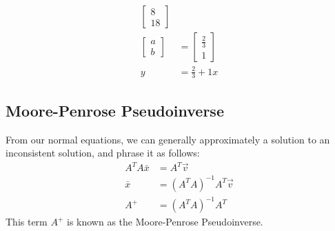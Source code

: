 \documentclass{math}
\begin{document}
\begin{align*}
\begin{bmatrix}
    8 \\ 18
  \end{bmatrix} \\
  \begin{bmatrix}
    a \\ b
  \end{bmatrix} &= \begin{bmatrix}
    \frac{2}{3} \\ 1
  \end{bmatrix} \\
  y &= \frac{2}{3}+1x
\end{align*}

\subsection*{Moore-Penrose Pseudoinverse}
From our normal equations, we can generally approximately a solution to an
inconsistent solution, and phrase it as follows:
\begin{align*}
  A^TA\bar{x} &= A^T\vec{v} \\
  \bar{x} &= (A^TA)^{-1}A^T\vec{v} \\
  A^+ &= (A^TA)^{-1}A^T
\end{align*}
This term \( A^+ \) is known as the Moore-Penrose Pseudoinverse.
\end{document}
